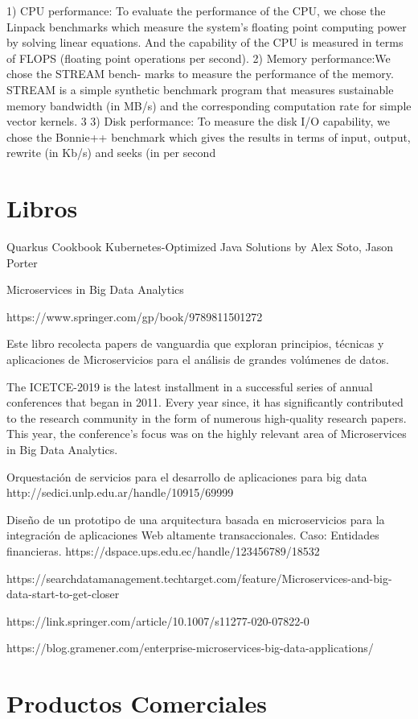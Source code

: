 1) CPU performance: To evaluate the performance of the
CPU, we chose the Linpack benchmarks which measure
the system’s floating point computing power by solving
linear equations. And the capability of the CPU is
measured in terms of FLOPS (floating point operations
per second).
2) Memory performance:We chose the STREAM bench-
marks to measure the performance of the memory.
STREAM is a simple synthetic benchmark program that
measures sustainable memory bandwidth (in MB/s) and
the corresponding computation rate for simple vector
kernels.
3
3) Disk performance: To measure the disk I/O capability,
we chose the Bonnie++ benchmark which gives the
results in terms of input, output, rewrite (in Kb/s) and
seeks (in per second

 

\section{Libros}

Quarkus Cookbook Kubernetes-Optimized Java Solutions by Alex Soto, Jason Porter

Microservices in Big Data Analytics

https://www.springer.com/gp/book/9789811501272

Este libro recolecta papers de vanguardia que exploran principios, técnicas y aplicaciones de Microservicios para el análisis de grandes volúmenes de datos.


The ICETCE-2019 is the latest installment in a successful series of annual conferences that began in 2011. Every year since, it has significantly contributed to the research community in the form of numerous high-quality research papers. This year, the conference’s focus was on the highly relevant area of Microservices in Big Data Analytics.


Orquestación de servicios para el desarrollo de aplicaciones para big data
http://sedici.unlp.edu.ar/handle/10915/69999


Diseño de un prototipo de una arquitectura basada en microservicios para la integración de aplicaciones Web altamente transaccionales. Caso: Entidades financieras.
https://dspace.ups.edu.ec/handle/123456789/18532

https://searchdatamanagement.techtarget.com/feature/Microservices-and-big-data-start-to-get-closer

https://link.springer.com/article/10.1007/s11277-020-07822-0

https://blog.gramener.com/enterprise-microservices-big-data-applications/

\section{Productos Comerciales}